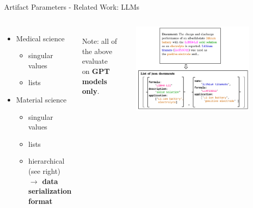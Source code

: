 \documentclass[en,16:9,smallfoot]{sdqbeamer}
\begin{document}
   \begin{frame}{Artifact Parameters - Related Work: LLMs}
   \begin{columns}
           \begin{itemize}
               \item Medical science~\cite{Agrawal2022}
                   \begin{itemize}
                       \item singular values
                       \item lists
                   \end{itemize}
               \item Material science~\cite{Xie2023,Polak2023,Dunn2022}
                   \begin{itemize}
                       \item singular values
                       \item lists
                       \item hierarchical~\cite{Dunn2022} (see right)\\\textbf{$\rightarrow$ data serialization format}
                   \end{itemize}
           \end{itemize}

          ‌\\
          Note: all of the above evaluate\\
          on \textbf{GPT models only}.
           \begin{center}\includegraphics[width=0.9\textwidth]{imgs/llm_sciext}\\{\tiny{}\par}\end{center}
   \end{columns}
   \end{frame}
\end{document}
